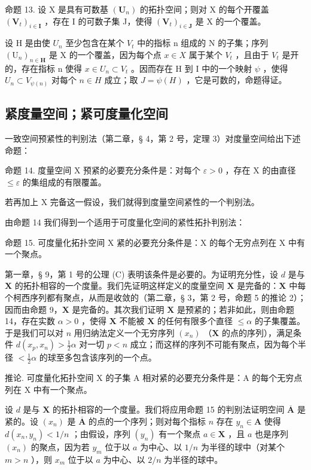 命题 13. 设 X 是具有可数基 \((\mathbf{U}_n)\) 的拓扑空间；则对 X 的每个开覆盖 \((\mathbf{V}_t)_{i \in \mathbf{I}}\) ，存在 I 的可数子集 J，使得 \((\mathbf{V}_t)_{i \in \mathbf{J}}\) 是 X 的一个覆盖。

设 H 是由使 \(U_{n}\) 至少包含在某个 \(V_{t}\) 中的指标 n 组成的 N 的子集；序列 \((\mathrm{U}_{n})_{n\in\mathbf{H}}\) 是 X 的一个覆盖，因为每个点 \(x\in X\) 属于某个 \(V_{t}\) ，且由于 \(V_{t}\) 是开的，存在指标 n 使得 \(x\in U_{n}\subset V_{t}\) 。因而存在 H 到 I 中的一个映射 \(\psi\) ，使得 \(U_{n}\subset V_{\psi(n)}\) 对每个 \(n\in H\) 成立；取 \(J=\psi(H)\) ，它是可数的，命题得证。

\subsection{紧度量空间；紧可度量化空间}

一致空间预紧性的判别法（第二章，§ 4，第 2 号，定理 3）对度量空间给出下述命题：

命题 14. 度量空间 X 预紧的必要充分条件是：对每个 \(\varepsilon > 0\) ，存在 X 的由直径 \(\leqslant \varepsilon\) 的集组成的有限覆盖。

若再加上 X 完备这一假设，我们就得到度量空间紧性的一个判别法。

由命题 14 我们得到一个适用于可度量化空间的紧性拓扑判别法：

命题 15. 可度量化拓扑空间 X 紧的必要充分条件是：X 的每个无穷点列在 X 中有一个聚点。

第一章，§ 9，第 1 号的公理 (C) 表明该条件是必要的。为证明充分性，设 \(d\) 是与 \(\mathbf{X}\) 的拓扑相容的一个度量。我们先证明这样定义的度量空间 \(\mathbf{X}\) 是完备的：\(\mathbf{X}\) 中每个柯西序列都有聚点，从而是收敛的（第二章，§ 3，第 2 号，命题 5 的推论 2）；因而由命题 9，\(\mathbf{X}\) 是完备的。其次我们证明 \(\mathbf{X}\) 是预紧的；若非如此，则由命题 14，存在实数 \(\alpha > 0\) ，使得 \(\mathbf{X}\) 不能被 \(\mathbf{X}\) 的任何有限多个直径 \(\leqslant \alpha\) 的子集覆盖。于是我们可以对 \(n\) 用归纳法定义一个无穷序列 \((x_n)\) （\(\mathbf{X}\) 的点的序列），满足条件 \(d(x_p, x_n) > \frac{1}{2} \alpha\) 对一切 \(p < n\) 成立；而这样的序列不可能有聚点，因为每个半径 \(< \frac{1}{2} \alpha\) 的球至多包含该序列的一个点。

推论. 可度量化拓扑空间 X 的子集 A 相对紧的必要充分条件是：A 的每个无穷点列在 X 中有一个聚点。

设 \(d\) 是与 \(\mathbf{X}\) 的拓扑相容的一个度量。我们将应用命题 15 的判别法证明空间 \(\overline{\mathbf{A}}\) 是紧的。设 \((x_{n})\) 是 \(\overline{\mathbf{A}}\) 的点的一个序列；则对每个指标 \(n\) 存在 \(y_{n} \in \mathbf{A}\) 使得 \(d(x_{n}, y_{n}) < 1/n\) ；由假设，序列 \((y_{n})\) 有一个聚点 \(a \in \mathbf{X}\) ，且 \(a\) 也是序列 \((x_{n})\) 的聚点，因为若 \(y_{m}\) 位于以 \(a\) 为中心、以 \(1/n\) 为半径的球中（对某个 \(m > n\) ），则 \(x_{m}\) 位于以 \(a\) 为中心、以 \(2/n\) 为半径的球中。

